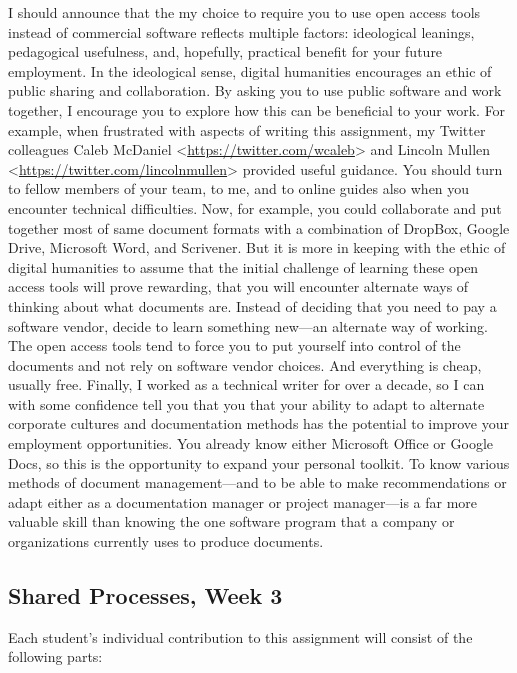 \documentclass[]{article}
\begin{document}
I should announce that the my choice to require you to use open access
tools instead of commercial software reflects multiple factors:
ideological leanings, pedagogical usefulness, and, hopefully, practical
benefit for your future employment. In the ideological sense, digital
humanities encourages an ethic of public sharing and collaboration. By
asking you to use public software and work together, I encourage you to
explore how this can be beneficial to your work. For example, when
frustrated with aspects of writing this assignment, my Twitter
colleagues Caleb McDaniel
\textless{}\url{https://twitter.com/wcaleb}\textgreater{} and Lincoln
Mullen \textless{}\url{https://twitter.com/lincolnmullen}\textgreater{}
provided useful guidance. You should turn to fellow members of your
team, to me, and to online guides also when you encounter technical
difficulties. Now, for example, you could collaborate and put together
most of same document formats with a combination of DropBox, Google
Drive, Microsoft Word, and Scrivener. But it is more in keeping with the
ethic of digital humanities to assume that the initial challenge of
learning these open access tools will prove rewarding, that you will
encounter alternate ways of thinking about what documents are. Instead
of deciding that you need to pay a software vendor, decide to learn
something new---an alternate way of working. The open access tools tend
to force you to put yourself into control of the documents and not rely
on software vendor choices. And everything is cheap, usually free.
Finally, I worked as a technical writer for over a decade, so I can with
some confidence tell you that you that your ability to adapt to
alternate corporate cultures and documentation methods has the potential
to improve your employment opportunities. You already know either
Microsoft Office or Google Docs, so this is the opportunity to expand
your personal toolkit. To know various methods of document
management---and to be able to make recommendations or adapt either as a
documentation manager or project manager---is a far more valuable skill
than knowing the one software program that a company or organizations
currently uses to produce documents.

\subsection{Shared Processes, Week 3}\label{shared-processes-week-3}

Each student's individual contribution to this assignment will consist
of the following parts:
\end{document}
